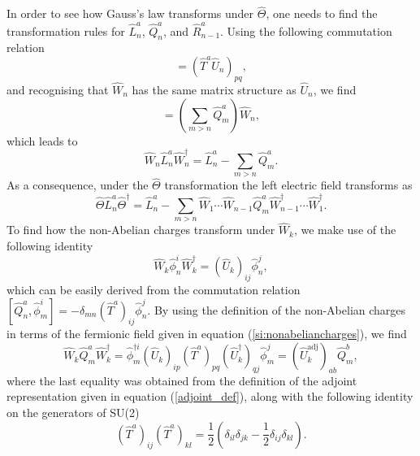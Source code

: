 \documentclass[twocolumn,aps,showpacs,prb,superscriptaddress,floatfix,10pt,nofootinbib]{revtex4-2}
\begin{document}
In order to see how Gauss's law transforms under $\hat{\Theta}$, one needs to find the transformation rules for $\hat{L}_{n}^{a}$, $\hat{Q}_{n}^{a}$, and $\hat{R}_{n-1}^{a}$. Using the following commutation relation \cite{kogut_hamiltonian_1975}
\begin{equation}
[ \hat{L}_{n}^{a},(\hat{U}_{n})_{pq}]=(\hat{T}^{a}\hat{U}_{n})_{pq} \label{commutation_L_U},
\end{equation}
and recognising that $\hat{W}_{n}$ has the same matrix structure as $\hat{U}_{n}$, we find \cite{sala_variational_2018}
\begin{equation}
[ \hat{L}_{n}^{a},\hat{W}_{n}]=\left( \sum_{m>n}\hat{Q}_{m}^{a}\right)\hat{W}_{n},
\end{equation}
which leads to 
\begin{equation}
\hat{W}_{n}\hat{L}_{n}^{a}\hat{W}_{n}^{\dagger}=\hat{L}_{n}^{a}-\sum_{m>n}\hat{Q}_{m}^{a}.
\end{equation}
As a consequence, under the $\hat{\Theta}$ transformation the left electric field transforms as 
\begin{equation}
\hat{\Theta}\hat{L}_{n}^{a}\hat{\Theta}^{\dagger}=\hat{L}_{n}^{a}-\sum_{m>n}\hat{W}_{1}\cdots \hat{W}_{n-1}\hat{Q}_{m}^{a}\hat{W}_{n-1}^{\dagger}\cdots \hat{W}_{1}^{\dagger}.
\end{equation}
To find how the non-Abelian charges transform under $\hat{W}_{k}$, we make use of the following identity 
\begin{equation}
\hat{W}_{k}\hat{\phi}_{n}^{i}\hat{W}_{k}^{\dagger}=(\hat{U}_{k})_{ij}\hat{\phi}_{n}^{j},
\end{equation}
which can be easily derived from the commutation relation $[\hat{Q}_{n}^{a},\hat{\phi}_{m}^{i}]=-\delta_{mn}(\hat{T}^{a})_{ij}\hat{\phi}_{n}^{j}$. By using the definition of the non-Abelian charges in terms of the fermionic field given in equation (\ref{si:nonabeliancharges}), we find 
\begin{equation}
\hat{W}_{k}\hat{Q}_{m}^{a}\hat{W}_{k}^{\dagger}=\hat{\phi}_{m}^{\dagger i}(\hat{U}_{k})_{i p} (\hat{T}^{a})_{pq}(\hat{U}^{\dagger}_{k})_{q j}\hat{\phi}_{m}^{j}=(\hat{U}_{k}^{\text{adj}})_{ab}\hat{Q}_{m}^{b},
\label{QtransformationbyW}
\end{equation}
where the last equality was obtained from the definition of the adjoint representation given in equation (\ref{adjoint_def}), along with the following identity on the generators of SU(2) \cite{Haber2021}
\begin{equation}
(\hat{T}^{a})_{ij} (\hat{T}^{a})_{kl}=\frac{1}{2}\left( \delta_{il}\delta_{jk}-\frac{1}{2}\delta_{ij}\delta_{kl}\right).
\end{equation}
\end{document}
